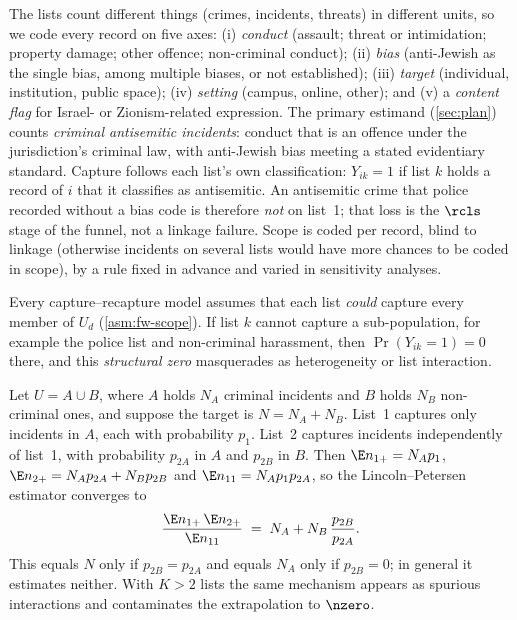 The lists count different things (crimes, incidents, threats) in different units, so we code every record on five axes: (i) \emph{conduct} (assault; threat or intimidation; property damage; other offence; non-criminal conduct); (ii) \emph{bias} (anti-Jewish as the single bias, among multiple biases, or not established); (iii) \emph{target} (individual, institution, public space); (iv) \emph{setting} (campus, online, other); and (v) a \emph{content flag} for Israel- or Zionism-related expression. The primary estimand (\cref{sec:plan}) counts \emph{criminal antisemitic incidents}: conduct that is an offence under the jurisdiction's criminal law, with anti-Jewish bias meeting a stated evidentiary standard. Capture follows each list's own classification: $Y_{ik}=1$ if list $k$ holds a record of $i$ that it classifies as antisemitic. An antisemitic crime that police recorded without a bias code is therefore \emph{not} on list~1; that loss is the $\rcls$ stage of the funnel, not a linkage failure. Scope is coded per record, blind to linkage (otherwise incidents on several lists would have more chances to be coded in scope), by a rule fixed in advance and varied in sensitivity analyses.

Every capture--recapture model assumes that each list \emph{could} capture every member of $U_d$ (\cref{asm:fw-scope}). If list $k$ cannot capture a sub-population, for example the police list and non-criminal harassment, then $\Pr(Y_{ik}=1)=0$ there, and this \emph{structural zero} masquerades as heterogeneity or list interaction.

\begin{example}\label{ex:src-scope}
Let $U=A\cup B$, where $A$ holds $N_A$ criminal incidents and $B$ holds $N_B$ non-criminal ones, and suppose the target is $N=N_A+N_B$. List~1 captures only incidents in $A$, each with probability $p_1$. List~2 captures incidents independently of list~1, with probability $p_{2A}$ in $A$ and $p_{2B}$ in $B$. Then $\E n_{1+}=N_Ap_1$, $\E n_{2+}=N_Ap_{2A}+N_Bp_{2B}$ and $\E n_{11}=N_Ap_1p_{2A}$, so the Lincoln--Petersen estimator converges to
\begin{equation}\label{eq:src-scope}
  \frac{\E n_{1+}\,\E n_{2+}}{\E n_{11}} \;=\; N_A + N_B\,\frac{p_{2B}}{p_{2A}}.
\end{equation}
This equals $N$ only if $p_{2B}=p_{2A}$ and equals $N_A$ only if $p_{2B}=0$; in general it estimates neither. With $K>2$ lists the same mechanism appears as spurious interactions and contaminates the extrapolation to $\nzero$.
\end{example}

